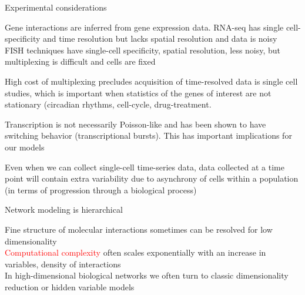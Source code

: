 \documentclass[aspectratio=1610]{beamer}					%
\begin{document}
\begin{frame}{Experimental considerations}

Gene interactions are inferred from gene expression data. RNA-seq has single cell-specificity and time resolution but lacks spatial resolution and data is noisy\\
\vspace{0.2in}
FISH techniques have single-cell specificity, spatial resolution, less noisy, but multiplexing is difficult and cells are fixed\\
\vspace{0.2in}

High cost of multiplexing precludes acquisition of time-resolved data is single cell studies, which is important when statistics of the genes of interest are not stationary (circadian rhythms, cell-cycle, drug-treatment.\\
\vspace{0.2in}

Transcription is not necessarily Poisson-like and has been shown to have switching behavior (transcriptional bursts). This has important implications for our models\\
\vspace{0.2in}

Even when we can collect single-cell time-series data, data collected at a time point will contain extra variability due to asynchrony of cells within a population (in terms of progression through a biological process)\\

\end{frame}

\begin{frame}{Network modeling is hierarchical}

Fine structure of molecular interactions sometimes can be resolved for low dimensionality\\
\vspace{0.2in}
\textcolor{red}{Computational complexity} often scales exponentially with an increase in variables, density of interactions\\
\vspace{0.2in}
In high-dimensional biological networks we often turn to classic dimensionality reduction or hidden variable models\\


\end{frame}
\end{document}

